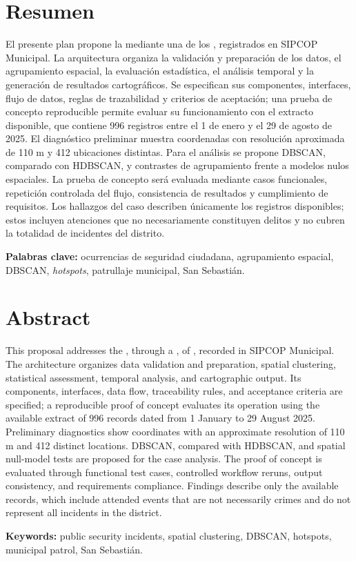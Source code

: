 \chapter*{Resumen}

\begingroup\singlespacing
El presente plan propone la  mediante una  de los , registrados en SIPCOP Municipal. La arquitectura organiza la validación y preparación de los datos, el agrupamiento espacial, la evaluación estadística, el análisis temporal y la generación de resultados cartográficos. Se especifican sus componentes, interfaces, flujo de datos, reglas de trazabilidad y criterios de aceptación; una prueba de concepto reproducible permite evaluar su funcionamiento con el extracto disponible, que contiene 996 registros entre el 1 de enero y el 29 de agosto de 2025. El diagnóstico preliminar muestra coordenadas con resolución aproximada de 110 m y 412 ubicaciones distintas. Para el análisis se propone DBSCAN, comparado con HDBSCAN, y contrastes de agrupamiento frente a modelos nulos espaciales. La prueba de concepto será evaluada mediante casos funcionales, repetición controlada del flujo, consistencia de resultados y cumplimiento de requisitos. Los hallazgos del caso describen únicamente los registros disponibles; estos incluyen atenciones que no necesariamente constituyen delitos y no cubren la totalidad de incidentes del distrito.

\medskip
\noindent\textbf{Palabras clave:} ocurrencias de seguridad ciudadana, agrupamiento espacial, DBSCAN, \textit{hotspots}, patrullaje municipal, San Sebastián.
\endgroup

\clearpage
\chapter*{Abstract}

\begingroup\singlespacing
This proposal addresses the , through a , of , recorded in SIPCOP Municipal. The architecture organizes data validation and preparation, spatial clustering, statistical assessment, temporal analysis, and cartographic output. Its components, interfaces, data flow, traceability rules, and acceptance criteria are specified; a reproducible proof of concept evaluates its operation using the available extract of 996 records dated from 1 January to 29 August 2025. Preliminary diagnostics show coordinates with an approximate resolution of 110 m and 412 distinct locations. DBSCAN, compared with HDBSCAN, and spatial null-model tests are proposed for the case analysis. The proof of concept is evaluated through functional test cases, controlled workflow reruns, output consistency, and requirements compliance. Findings describe only the available records, which include attended events that are not necessarily crimes and do not represent all incidents in the district.

\medskip
\noindent\textbf{Keywords:} public security incidents, spatial clustering, DBSCAN, hotspots, municipal patrol, San Sebastián.
\endgroup
